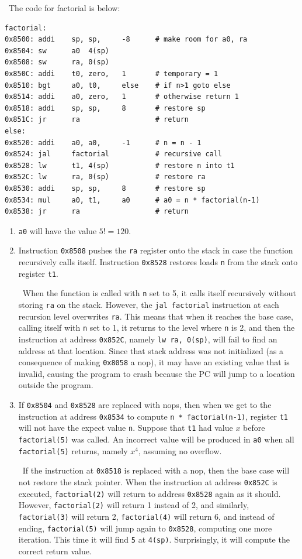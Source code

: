 \documentclass[12pt]{article}
\newenvironment{sol}[1][Solution]{\begin{trivlist}
		\item[\hskip \labelsep {\bfseries #1:}]}{\end{trivlist}}
\begin{document}
\begin{sol}
	\
	The code for factorial is below:
	\begin{lstlisting}[language={}]
factorial:
0x8500:	addi	sp,	sp,		-8		# make room for a0, ra
0x8504:	sw		a0	4(sp)
0x8508:	sw		ra,	0(sp)
0x850C:	addi	t0,	zero,	1		# temporary = 1
0x8510:	bgt		a0,	t0,		else	# if n>1 goto else
0x8514:	addi	a0,	zero,	1		# otherwise return 1
0x8518:	addi	sp,	sp,		8		# restore sp
0x851C:	jr		ra					# return
else:
0x8520:	addi	a0,	a0,		-1		# n = n - 1
0x8524:	jal		factorial			# recursive call
0x8528:	lw		t1,	4(sp)			# restore n into t1
0x852C:	lw		ra,	0(sp)			# restore ra
0x8530:	addi	sp,	sp,		8		# restore sp
0x8534:	mul		a0,	t1,		a0		# a0 = n * factorial(n-1)
0x8538:	jr		ra					# return
	\end{lstlisting}
	\begin{enumerate}[label=(\alph*)]
		\item \texttt{a0} will have the value $5!=120$.
		\item Instruction \texttt{0x8508} pushes the \texttt{ra} register
		onto the stack in case the function recursively calls itself. Instruction
		\texttt{0x8528} restores loads \texttt{n} from the stack onto 
		register \texttt{t1}.
		
		\
		When the function is called with \texttt{n} set to 5, it calls itself
		recursively without storing \texttt{ra} on the stack. However, the
		\texttt{jal factorial} instruction at each recursion level overwrites
		\texttt{ra}. This means that when it reaches the base case, calling itself
		with \texttt{n} set to 1, it returns to the level where \texttt{n} is 2,
		and then the instruction at address \texttt{0x852C}, namely
		\texttt{lw ra, 0(sp)}, will fail to find an address at that location.
		Since that stack address was not initialized (as a consequence of making
		\texttt{0x8058} a nop), it may have an existing value that is invalid,
		causing the program to crash because the PC will jump to a location outside
		the program.
		\item If \texttt{0x8504} and \texttt{0x8528} are replaced with nops,
		then when we get to the instruction at address \texttt{0x8534} to compute
		\texttt{n * factorial(n-1)}, register \texttt{t1} will not have
		the expect value \texttt{n}. Suppose that \texttt{t1} had value
		$x$ before \texttt{factorial(5)} was called. An incorrect value will be
		produced in \texttt{a0} when all \texttt{factorial(5)} returns, namely
		$x^4$, assuming no overflow.
		
		\
		If the instruction at \texttt{0x8518} is replaced with a nop, then the base
		case will not restore the stack pointer. When the instruction at address
		\texttt{0x852C} is executed, \texttt{factorial(2)} will return to
		address \texttt{0x8528} again as it should. However, \texttt{factorial(2)}
		will return 1 instead of 2, and similarly, \texttt{factorial(3)}
		will return 2, \texttt{factorial(4)} will return 6, and instead of ending,
		\texttt{factorial(5)} will jump again to \texttt{0x8528}, computing one
		more iteration. This time it will find \texttt{5} at \texttt{4(sp)}.
		Surprisingly, it will compute the correct return value.
		

\end{enumerate}
\end{sol}
\end{document}
